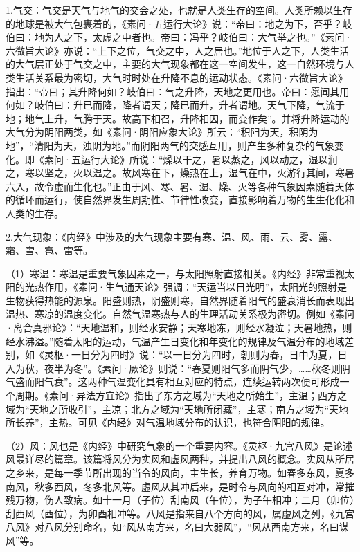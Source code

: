\documentclass[draft,12pt]{ctexbook}
\begin{document}
1.气交：气交是天气与地气的交会之处，也就是人类生存的空间。人类所赖以生存的地球是被大气包裹着的，《素问·五运行大论》说：“帝曰：地之为下，否乎？岐伯曰：地为人之下，太虚之中者也。帝曰：冯乎？岐伯曰：大气举之也。”《素问·六微旨大论》亦说：“上下之位，气交之中，人之居也。”地位于人之下，人类生活的大气层正处于气交之中，主要的大气现象都在这一空间发生，这一自然环境与人类生活关系最为密切，大气时时处在升降不息的运动状态。《素问·六微旨大论》指出：“帝曰；其升降何如？岐伯曰：气之升降，天地之更用也。帝曰：愿闻其用何如？岐伯曰：升已而降，降者谓天；降已而升，升者谓地。天气下降，气流于地；地气上升，气腾于天。故高下相召，升降相因，而变作矣”。并将升降运动的大气分为阴阳两类，如《素问·阴阳应象大论》所云：“积阳为天，积阴为地”，“清阳为天，浊阴为地。”而阴阳两气的交感互用，则产生多种复杂的气象变化。即《素问·五运行大论》所说：“燥以干之，暑以蒸之，风以动之，湿以润之，寒以坚之，火以温之。故风寒在下，燥热在上，湿气在中，火游行其间，寒暑六入，故令虚而生化也。”正由于风、寒、暑、湿、燥、火等各种气象因素随着天体的循环而运行，使自然界发生周期性、节律性改变，直接影响着万物的生生化化和人类的生存。

2.大气现象：《内经》中涉及的大气现象主要有寒、温、风、雨、云、雾、露、霜、雪、雹、雷等。

（1）寒温：寒温是重要气象因素之一，与太阳照射直接相关。《内经》非常重视太阳的光热作用，《素问·生气通天论》强调：“天运当以日光明”，太阳光的照射是生物获得热能的源泉。阳盛则热，阴盛则寒，自然界随着阳气的盛衰消长而表现出温热、寒凉的温度变化。自然气温寒热与人的生理活动关系极为密切。例如《素问·离合真邪论》：“天地温和，则经水安静；天寒地冻，则经水凝泣；天暑地热，则经水沸溢。”随着太阳的运动，气温产生日变化和年变化的规律及气温分布的地域差别，如《灵枢·一日分为四时》说：“以一日分为四时，朝则为春，日中为夏，日入为秋，夜半为冬”。《素问·厥论》则说：“春夏则阳气多而阴气少，……秋冬则阴气盛而阳气衰”。这两种气温变化具有相互对应的特点，连续运转两次便可形成一个周期。《素问·异法方宜论》指出了东方之域为“天地之所始生”，主温；西方之域为“天地之所收引”，主凉；北方之域为“天地所闭藏”，主寒；南方之域为“天地所长养”，主热。可见《内经》对气温地域分布的认识，也符合阴阳的规律。

（2）风：风也是《内经》中研究气象的一个重要内容。《灵枢·九宫八风》是论述风最详尽的篇章。该篇将风分为实风和虚风两种，并提出八风的概念。实风从所居之乡来，是每一季节所出现的当令的风向，主生长，养育万物。如春多东风，夏多南风，秋多西风，冬多北风等。虚风从其冲后来，是时令与风向的相互对冲，常摧残万物，伤人致病。如十一月（子位）刮南风（午位），为子午相冲；二月（卯位）刮西风（酉位），为卯酉相冲等。八风是指来自八个方向的风，属虚风之列，《九宫八风》对八风分别命名，如“风从南方来，名曰大弱风”，“风从西南方来，名曰谋风”等。
\end{document}
